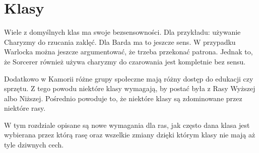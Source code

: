 \section{Klasy}
\label{sec:class}

Wiele z domyślnych klas ma swoje bezsensowności. Dla przykładu: używanie
Charyzmy do rzucania zaklęć. Dla Barda ma to jeszcze sens. W przypadku Warlocka
można jeszcze argumentować, że trzeba przekonać patrona. Jednak to, że Sorcerer
również używa charyzmy do czarowania jest kompletnie bez sensu.

Dodatkowo w Kamorii różne grupy społeczne mają różny dostęp do edukacji czy
sprzętu. Z tego powodu niektóre klasy wymagają, by postać była z Rasy Wyższej
albo Niższej. Pośrednio powoduje to, że niektóre klasy są zdominowane przez
niektóre rasy.

W tym rozdziale opisane są nowe wymagania dla ras, jak często dana klasa jest
wybierana przez którą rasę oraz wszelkie zmiany dzięki którym klasy nie mają aż
tyle dziwnych cech.


% 



